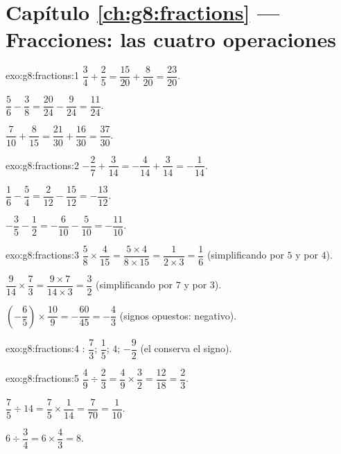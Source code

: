 \section*{Capítulo \ref{ch:g8:fractions} --- Fracciones: las cuatro operaciones}

\begin{solution}{exo:g8:fractions:1}
$\dfrac34 + \dfrac25 = \dfrac{15}{20} + \dfrac{8}{20} =
\dfrac{23}{20}$.

$\dfrac56 - \dfrac38 = \dfrac{20}{24} - \dfrac{9}{24} =
\dfrac{11}{24}$.

$\dfrac{7}{10} + \dfrac{8}{15} = \dfrac{21}{30} + \dfrac{16}{30} =
\dfrac{37}{30}$.
\end{solution}

\begin{solution}{exo:g8:fractions:2}
$-\dfrac27 + \dfrac{3}{14} = -\dfrac{4}{14} + \dfrac{3}{14} =
-\dfrac{1}{14}$.

$\dfrac16 - \dfrac54 = \dfrac{2}{12} - \dfrac{15}{12} =
-\dfrac{13}{12}$.

$-\dfrac35 - \dfrac12 = -\dfrac{6}{10} - \dfrac{5}{10} =
-\dfrac{11}{10}$.
\end{solution}

\begin{solution}{exo:g8:fractions:3}
$\dfrac58 \times \dfrac{4}{15} = \dfrac{5 \times 4}{8 \times 15}
= \dfrac{1}{2 \times 3} = \dfrac16$ (simplificando por $5$ y por $4$).

$\dfrac{9}{14} \times \dfrac73 = \dfrac{9 \times 7}{14 \times 3}
= \dfrac{3}{2}$ (simplificando por $7$ y por $3$).

$\left(-\dfrac65\right) \times \dfrac{10}{9} = -\dfrac{60}{45}
= -\dfrac43$ (signos opuestos: negativo).
\end{solution}

\begin{solution}{exo:g8:fractions:4}
: $\dfrac73$; \quad $\dfrac15$; \quad $4$; \quad
$-\dfrac92$ (el  conserva el signo).
\end{solution}

\begin{solution}{exo:g8:fractions:5}
$\dfrac49 \div \dfrac23 = \dfrac49 \times \dfrac32 = \dfrac{12}{18}
= \dfrac23$.

$\dfrac75 \div 14 = \dfrac75 \times \dfrac{1}{14} = \dfrac{7}{70}
= \dfrac{1}{10}$.

$6 \div \dfrac34 = 6 \times \dfrac43 = 8$.
\end{solution}

